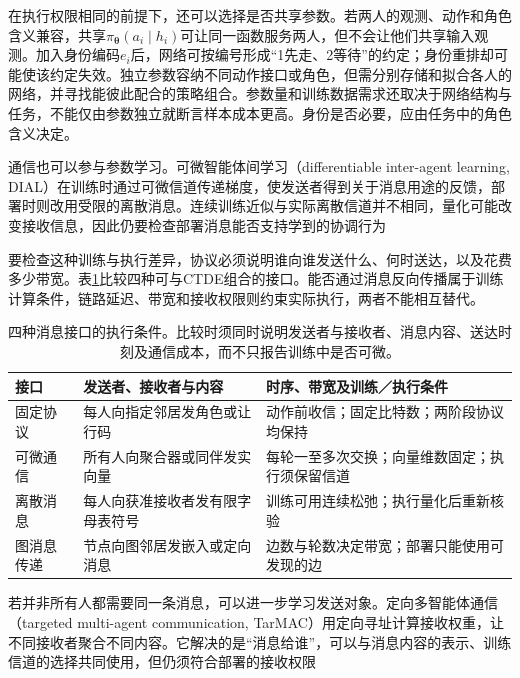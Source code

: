 在执行权限相同的前提下，还可以选择是否共享参数。若两人的观测、动作和角色含义兼容，共享$\pi_{\bm\theta}(a_i\mid h_i)$可让同一函数服务两人，但不会让他们共享输入观测。加入身份编码$e_i$后，网络可按编号形成“1先走、2等待”的约定；身份重排却可能使该约定失效。独立参数容纳不同动作接口或角色，但需分别存储和拟合各人的网络，并寻找能彼此配合的策略组合。参数量和训练数据需求还取决于网络结构与任务，不能仅由参数独立就断言样本成本更高。身份是否必要，应由任务中的角色含义决定。

通信也可以参与参数学习。可微智能体间学习（differentiable inter-agent learning, DIAL）在训练时通过可微信道传递梯度，使发送者得到关于消息用途的反馈，部署时则改用受限的离散消息。连续训练近似与实际离散信道并不相同，量化可能改变接收信息，因此仍要检查部署消息能否支持学到的协调行为

要检查这种训练与执行差异，协议必须说明谁向谁发送什么、何时送达，以及花费多少带宽。表\ref{tab:rl-multi-agent-communication}比较四种可与CTDE组合的接口。能否通过消息反向传播属于训练计算条件，链路延迟、带宽和接收权限则约束实际执行，两者不能相互替代。

\begin{table}[htbp]
 \centering
 \begin{tabularx}{\linewidth}{@{}l >{\raggedright\arraybackslash}X >{\raggedright\arraybackslash}X@{}}
 \toprule
 接口 & 发送者、接收者与内容 & 时序、带宽及训练／执行条件\\
 \midrule
 固定协议 & 每人向指定邻居发角色或让行码 & 动作前收信；固定比特数；两阶段协议均保持\\
 可微通信 & 所有人向聚合器或同伴发实向量 & 每轮一至多次交换；向量维数固定；执行须保留信道\\
 离散消息 & 每人向获准接收者发有限字母表符号 & 训练可用连续松弛；执行量化后重新核验\\
 图消息传递 & 节点向图邻居发嵌入或定向消息 & 边数与轮数决定带宽；部署只能使用可发现的边\\
 \bottomrule
 \end{tabularx}
 \caption{四种消息接口的执行条件。比较时须同时说明发送者与接收者、消息内容、送达时刻及通信成本，而不只报告训练中是否可微。}
 \label{tab:rl-multi-agent-communication}
\end{table}

若并非所有人都需要同一条消息，可以进一步学习发送对象。定向多智能体通信（targeted multi-agent communication, TarMAC）用定向寻址计算接收权重，让不同接收者聚合不同内容。它解决的是“消息给谁”，可以与消息内容的表示、训练信道的选择共同使用，但仍须符合部署的接收权限

